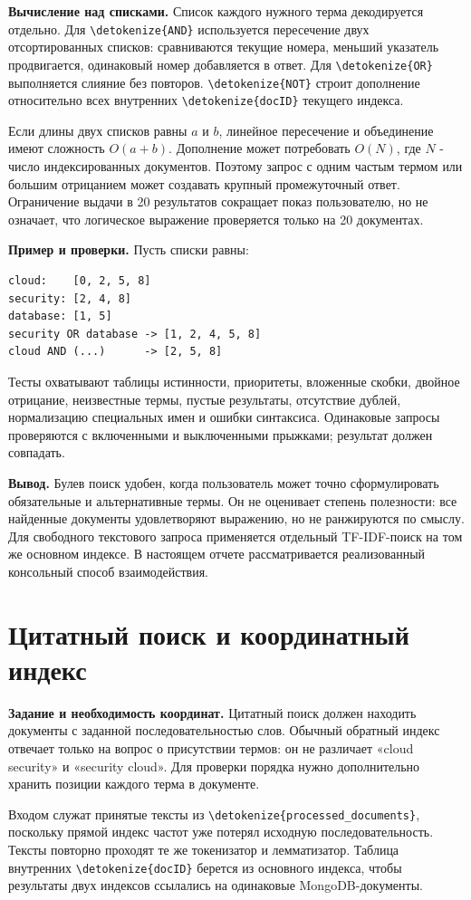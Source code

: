 \documentclass[pdf,unicode,12pt,a4paper,oneside,fleqn]{article}
\newcommand{\labsection}[2]{\par\Needspace{9\baselineskip}\setcounter{section}{\numexpr#1-1\relax}\section{#2}}
\newcommand{\partlabel}[1]{\par\Needspace{4\baselineskip}\medskip\textbf{#1.}\quad}
\DeclareRobustCommand{\code}[1]{\expandafter\nolinkurl\expandafter{\detokenize{#1}}}
\begin{document}
\partlabel{Вычисление над списками}
Список каждого нужного терма декодируется отдельно. Для \code{AND}
используется пересечение двух отсортированных списков: сравниваются текущие
номера, меньший указатель продвигается, одинаковый номер добавляется в ответ.
Для \code{OR} выполняется слияние без повторов. \code{NOT} строит дополнение
относительно всех внутренних \code{docID} текущего индекса.

Если длины двух списков равны $a$ и $b$, линейное пересечение и объединение
имеют сложность $O(a+b)$. Дополнение может потребовать $O(N)$, где $N$ - число
индексированных документов. Поэтому запрос с одним частым термом или большим
отрицанием может создавать крупный промежуточный ответ. Ограничение выдачи
в 20 результатов сокращает показ пользователю, но не означает, что логическое
выражение проверяется только на 20 документах.

\partlabel{Пример и проверки}
Пусть списки равны:
\begin{lstlisting}
cloud:    [0, 2, 5, 8]
security: [2, 4, 8]
database: [1, 5]
security OR database -> [1, 2, 4, 5, 8]
cloud AND (...)      -> [2, 5, 8]
\end{lstlisting}

Тесты охватывают таблицы истинности, приоритеты, вложенные скобки, двойное
отрицание, неизвестные термы, пустые результаты, отсутствие дублей,
нормализацию специальных имен и ошибки синтаксиса. Одинаковые запросы
проверяются с включенными и выключенными прыжками; результат должен совпадать.

\partlabel{Вывод}
Булев поиск удобен, когда пользователь может точно сформулировать обязательные
и альтернативные термы. Он не оценивает степень полезности: все найденные
документы удовлетворяют выражению, но не ранжируются по смыслу. Для свободного
текстового запроса применяется отдельный TF-IDF-поиск на том же основном
индексе. В настоящем отчете рассматривается реализованный консольный способ
взаимодействия.

\labsection{10}{Цитатный поиск и координатный индекс}

\partlabel{Задание и необходимость координат}
Цитатный поиск должен находить документы с заданной последовательностью слов.
Обычный обратный индекс отвечает только на вопрос о присутствии термов:
он не различает «cloud security» и «security cloud». Для проверки порядка
нужно дополнительно хранить позиции каждого терма в документе.

Входом служат принятые тексты из \code{processed_documents}, поскольку
прямой индекс частот уже потерял исходную последовательность. Тексты повторно
проходят те же токенизатор и лемматизатор. Таблица внутренних \code{docID}
берется из основного индекса, чтобы результаты двух индексов ссылались
на одинаковые MongoDB-документы.
\end{document}
